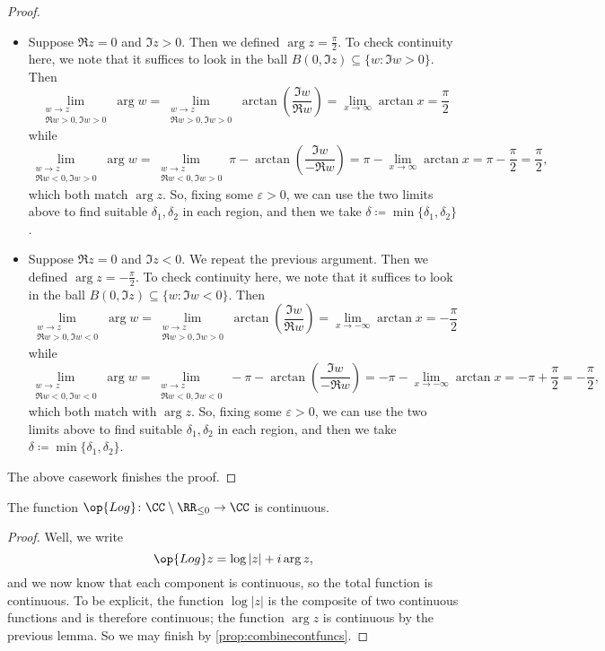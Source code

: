 \begin{proof}
\begin{itemize}
		\item Suppose $\Re z=0$ and $\Im z>0$. Then we defined $\arg z=\frac\pi2$. To check continuity here, we note that it suffices to look in the ball $B(0,\Im z)\subseteq\{w:\Im w>0\}$. Then
		\[\lim_{\substack{w\to z\\\Re w>0,\Im w>0}}\arg w=\lim_{\substack{w\to z\\\Re w>0,\Im w>0}}\arctan\left(\frac{\Im w}{\Re w}\right)=\lim_{x\to\infty}\arctan x=\frac\pi2\]
		while
		\[\lim_{\substack{w\to z\\\Re w<0,\Im w>0}}\arg w=\lim_{\substack{w\to z\\\Re w<0,\Im w>0}}\pi-\arctan\left(\frac{\Im w}{-\Re w}\right)=\pi-\lim_{x\to\infty}\arctan x=\pi-\frac\pi2=\frac\pi2,\]
		which both match $\arg z$. So, fixing some $\varepsilon>0$, we can use the two limits above to find suitable $\delta_1,\delta_2$ in each region, and then we take $\delta\coloneqq \min\{\delta_1,\delta_2\}$.
		\item Suppose $\Re z=0$ and $\Im z<0$. We repeat the previous argument. Then we defined $\arg z=-\frac\pi2$. To check continuity here, we note that it suffices to look in the ball $B(0,\Im z)\subseteq\{w:\Im w<0\}$. Then
		\[\lim_{\substack{w\to z\\\Re w>0,\Im w<0}}\arg w=\lim_{\substack{w\to z\\\Re w>0,\Im w>0}}\arctan\left(\frac{\Im w}{\Re w}\right)=\lim_{x\to-\infty}\arctan x=-\frac\pi2\]
		while
		\[\lim_{\substack{w\to z\\\Re w<0,\Im w<0}}\arg w=\lim_{\substack{w\to z\\\Re w<0,\Im w<0}}-\pi-\arctan\left(\frac{\Im w}{-\Re w}\right)=-\pi-\lim_{x\to-\infty}\arctan x=-\pi+\frac\pi2=-\frac\pi2,\]
		which both match with $\arg z$. So, fixing some $\varepsilon>0$, we can use the two limits above to find suitable $\delta_1,\delta_2$ in each region, and then we take $\delta\coloneqq \min\{\delta_1,\delta_2\}$.
	\end{itemize}
	The above casework finishes the proof.
\end{proof}
\begin{corollary} \label{cor:logcont}
	The function $\op{Log}\colon \CC\setminus\RR_{\le0}\to\CC$ is continuous.
\end{corollary}
\begin{proof}
	Well, we write
	\[\op{Log}z=\log|z|+i\arg z,\]
	and we now know that each component is continuous, so the total function is continuous. To be explicit, the function $\log|z|$ is the composite of two continuous functions and is therefore continuous; the function $\arg z$ is continuous by the previous lemma. So we may finish by \autoref{prop:combinecontfuncs}.
\end{proof}
